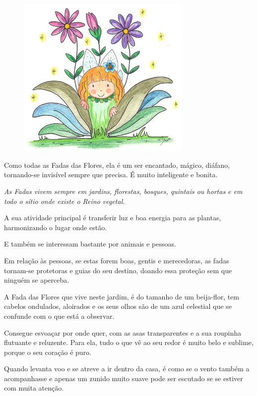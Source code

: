\documentclass[12pt, a4paper, twoside]{memoir}
\begin{document}
\begin{figure}[h]
    \centering
    \includegraphics[width=0.75\textwidth]{a_espreitar_os_namorados}
\end{figure}

Como todas as Fadas das Flores, ela é um ser encantado, mágico, diáfano, tornando-se invisível sempre que precisa. É muito inteligente e bonita.
\bigbreak

{\itshape
As Fadas vivem sempre em jardins, florestas, bosques, quintais ou hortas e em todo o sítio onde existe o Reino vegetal.

A sua atividade principal é transferir luz e boa energia para as plantas, harmonizando o lugar onde estão.

E também se interessam bastante por animais e pessoas.

Em relação às pessoas, se estas forem boas, gentis e merecedoras, as fadas tornam-se protetoras e guias do seu destino, doando essa proteção sem que ninguém se aperceba.
}
\bigbreak
A Fada das Flores que vive neste jardim, é do tamanho de um beija-flor, tem cabelos ondulados, aloirados e os seus olhos são de um azul celestial que se confunde com o que está a observar.

Consegue esvoaçar por onde quer, com as asas transparentes e a sua roupinha flutuante e reluzente. Para ela, tudo o que vê ao seu redor é muito belo e sublime, porque o seu coração é puro.

Quando levanta voo e se atreve a ir dentro da casa, é como se o vento também a acompanhasse e apenas um zunido muito suave pode ser escutado se se estiver com muita atenção.
\end{document}
